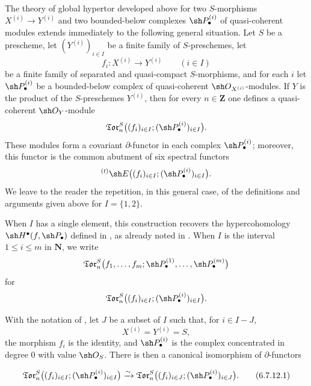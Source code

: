 \begin{env}[6.7.11]
\label{III.6.7.11}
The theory of global hypertor developed above for two
$S$-morphisms $X^{(i)}\to Y^{(i)}$ and two bounded-below
complexes $\sh P_\bullet^{(i)}$ of quasi-coherent modules extends
immediately to the following general situation.  Let $S$ be a
prescheme, let $(Y^{(i)})_{i\in I}$ be a finite family of
$S$-preschemes, let
\[
  f_i:X^{(i)}\longrightarrow Y^{(i)}
  \qquad (i\in I)
\]
be a finite family of separated and quasi-compact
$S$-morphisms, and for each $i$ let $\sh P_\bullet^{(i)}$ be a
bounded-below complex of quasi-coherent
$\sh O_{X^{(i)}}$-modules.  If $Y$ is the product of the
$S$-preschemes $Y^{(i)}$, then for every $n\in\mathbf Z$ one
defines a quasi-coherent $\sh O_Y$-module
\[
  \mathfrak{Tor}_n^S
  \bigl(
    (f_i)_{i\in I};
    (\sh P_\bullet^{(i)})_{i\in I}
  \bigr).
\]
These modules form a covariant $\partial$-functor in each complex
$\sh P_\bullet^{(i)}$; moreover, this functor is the common
abutment of six spectral functors
\[
  {}^{(t)}\sh E
  \bigl(
    (f_i)_{i\in I};
    (\sh P_\bullet^{(i)})_{i\in I}
  \bigr).
\]
We leave to the reader the repetition, in this general case, of
the definitions and arguments given above for $I=\{1,2\}$.

When $I$ has a single element, this construction recovers the
hypercohomology $\sh H^\bullet(f,\sh P_\bullet)$ defined in
, as already noted in .  When
$I$ is the interval $1\leq i\leq m$ in $\mathbf N$, we write
\label{III.6.7.11.2}
\[
  \mathfrak{Tor}_n^S
  \bigl(
    f_1,\ldots,f_m;
    \sh P_\bullet^{(1)},\ldots,\sh P_\bullet^{(m)}
  \bigr)
\]
for
\[
  \mathfrak{Tor}_n^S
  \bigl(
    (f_i)_{i\in I};
    (\sh P_\bullet^{(i)})_{i\in I}
  \bigr).
\]
\end{env}

\begin{proposition}[6.7.12]
\label{III.6.7.12}
With the notation of , let $J$ be a subset of
$I$ such that, for $i\in I-J$,
\[
  X^{(i)}=Y^{(i)}=S,
\]
the morphism $f_i$ is the identity, and
$\sh P_\bullet^{(i)}$ is the complex concentrated in degree $0$
with value $\sh O_S$.  There is then a canonical isomorphism of
$\partial$-functors
\begin{env}[6.7.12.1]
\label{III.6.7.12.1}
\[
  \mathfrak{Tor}_n^S
  \bigl(
    (f_i)_{i\in I};
    (\sh P_\bullet^{(i)})_{i\in I}
  \bigr)
  \xrightarrow{\sim}
  \mathfrak{Tor}_n^S
  \bigl(
    (f_i)_{i\in J};
    (\sh P_\bullet^{(i)})_{i\in J}
  \bigr).
  \tag{6.7.12.1}\label{III.6.7.12.1.eq}
\]
\end{env}
\end{proposition}

